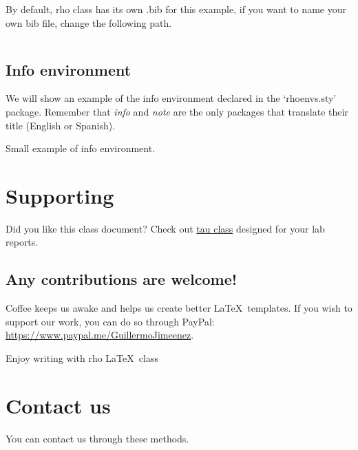 \documentclass[9pt,a4paper,twoside]{rho-class/rho}
\begin{document}
        By default, rho class has its own .bib for this example, if you want to name your own bib file, change the following path.

\nolinenumbers
\begin{lstlisting}[language=TeX]

\end{lstlisting}
\linenumbers

    \subsection{Info environment}

        We will show an example of the info environment declared in the ‘rhoenvs.sty’ package. Remember that \textit{info} and \textit{note} are the only packages that translate their title (English or Spanish).

        \begin{info}
            Small example of info environment.
        \end{info}

\section{Supporting}

    Did you like this class document? Check out \href{https://www.overleaf.com/latex/templates/tau-class-lab-report-template/chhshmhxstsq}{tau class} designed for your lab reports.

    \subsection*{Any contributions are welcome!}
    
        Coffee keeps us awake and helps us create better \LaTeX\ templates. If you wish to support our work, you can do so through PayPal:\\
        \url{https://www.paypal.me/GuillermoJimeenez}.
        
        \begin{center}
            Enjoy writing with rho \LaTeX\ class\hspace{5pt}\faChessKnight 
        \end{center}

\section{Contact us}

    You can contact us through these methods.\\
    
\end{document}
